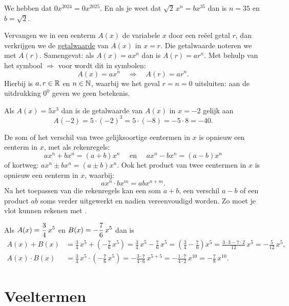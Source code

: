 \documentclass{ximera}
\begin{document}
\begin{voorbeeld}
We hebben dat $0x^{2024} = 0x^{2025}$. En als je weet dat $\sqrt{2}\,x^n = bx^{35}$ dan is $n = 35$ en $b = \sqrt{2}$.
\end{voorbeeld}

\clearpage

Vervangen we in een eenterm $A(x)$ de variabele $x$ door een re\"eel getal $r$, dan verkrijgen we de \underline{getalwaarde} van $A(x)$ in $x = r$. Die getalwaarde noteren we met $A(r)$. Samengevat: als $A(x) = ax^n$ dan is $A(r) = ar^n$. Met behulp van het symbool $\Rightarrow$ voor  wordt dit in symbolen:
\[
A(x) = ax^n \quad \Rightarrow \quad A(r) = a r^n.
\]
Hierbij is $a,r \in \mathbb{R}$ en $n \in \mathbb{N}$, waarbij we het geval $r = n = 0$ uitsluiten: aan de uitdrukking $0^0$ geven we geen betekenis.

\begin{voorbeeld}
Als $A(x) = 5x^3$ dan is de getalwaarde van $A(x)$ in $x = -2$ gelijk aan 
\[
A(-2) = 5 \cdot (-2)^3 = 5 \cdot (-8) = - 5 \cdot 8 = -40.
\]
\end{voorbeeld}

De som of het verschil van twee gelijksoortige eentermen in $x$ is opnieuw een eenterm in $x$, met als rekenregels:
\[
ax^n + bx^n = (a+b)x^n \quad \text{ en } \quad ax^n - bx^n = (a-b)x^n
\]
of kortweg: $ax^n \pm bx^n = (a\pm b)x^n$. Ook het product van twee eentermen in $x$ is opnieuw een eenterm in $x$, waarbij:
\[
ax^n \cdot bx^m = abx^{n+m}.
\]
Na het toepassen van die rekenregels kan een som $a+b$, een verschil $a-b$ of een product $ab$ soms verder uitgewerkt en nadien vereenvoudigd worden. Zo moet je vlot kunnen rekenen met .

\begin{voorbeeld}
Als $\displaystyle A(x) = \frac{3}{4}\,x^5$ en $\displaystyle B(x) = -\frac{7}{6}\,x^5$ dan is 
\begin{align*}
A(x) + B(x) & = \frac{3}{4}\,x^5 + \left(-\frac{7}{6}\,x^5\right) 
= \frac{3}{4}\,x^5 - \frac{7}{6}\,x^5
= \left(\frac{3}{4} - \frac{7}{6}\right)x^5 
= \frac{3 \cdot 3 - 7 \cdot 2}{12}\,x^5 
= -\frac{5}{12}\,x^5, \\
A(x) \cdot B(x) & = \frac{3}{4}\,x^5 \cdot \left(-\frac{7}{6}\,x^5\right) = - \frac{3 \cdot 7}{4 \cdot 6}\,x^{5+5} = -\frac{1\cdot 7}{4 \cdot 2}\, x^{10} = -\frac{7}{8}\,x^{10}. 
\end{align*}
\end{voorbeeld}

\section{Veeltermen}
\end{document}
